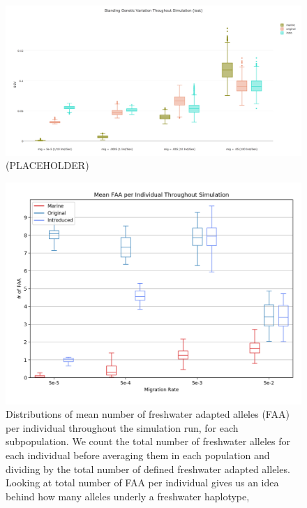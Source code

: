 \documentclass{article}
\begin{document}
\begin{figure}
	\begin{center}
  		\includegraphics[width=\linewidth]{plotlyPlots/StandingGeneticVariation.png}
  		\caption{(PLACEHOLDER)}
		\label{fig:SGV}
	\end{center}
\end{figure}

\begin{figure}
	\begin{center}
  		\includegraphics[width=\linewidth]{matplotlibPlots/MFAI.png}
  		\caption{Distributions of mean number of freshwater adapted alleles (FAA) per individual throughout the simulation run, for each subpopulation.
		We count the total number of freshwater alleles for each individual before averaging them in each population and dividing by the total number of defined
		freshwater adapted alleles.
		Looking at total number of FAA per individual gives us an idea behind how many alleles underly a freshwater haplotype, 
		}
  		\label{fig:MNFAI}
	\end{center}
\end{figure}
\end{document}

